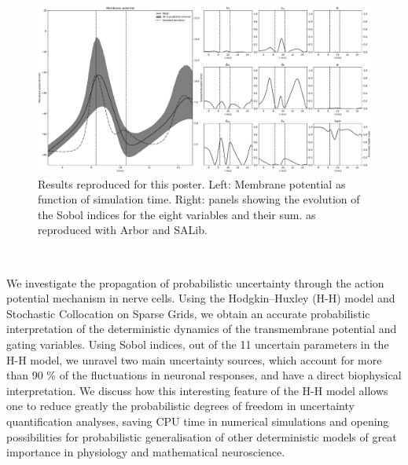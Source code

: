 \documentclass{beamer}
\begin{document}
\begin{frame}[t, fragile]
\begin{columns}[onlytextwidth,T]
\begin{column}{0.63\textwidth}
      \begin{figure}[htp]
        \centering
        \includegraphics[width=\textwidth]{hh_sensitivity}
          \caption{Results reproduced for this poster.
          Left: Membrane potential as function of simulation time. Right: panels showing
          the evolution of the Sobol indices for the eight variables and their sum.
          as reproduced with Arbor and SALib.}
          \label{result}
      \end{figure}

    \end{column}
  \end{columns}

  \vspace*{-24ex}

  \begin{columns}[onlytextwidth]
    \begin{column}{.49\linewidth}
      \vspace*{24ex}

      \textbf{}\\
      We investigate the propagation of probabilistic uncertainty through the action
      potential mechanism in nerve cells. Using the Hodgkin–Huxley (H-H) model
      and Stochastic Collocation on Sparse Grids, we obtain an accurate probabilistic
      interpretation of the deterministic dynamics of the transmembrane potential and gating
      variables. Using Sobol indices, out of the 11 uncertain parameters in the H-H model,
      we unravel two main uncertainty sources, which account for more than 90 \% of the
      fluctuations in neuronal responses, and have a direct biophysical interpretation. We
      discuss how this interesting feature of the H-H model allows one to reduce greatly the
      probabilistic degrees of freedom in uncertainty quantification analyses, saving CPU
      time in numerical simulations and opening possibilities for probabilistic generalisation
      of other deterministic models of great importance in physiology and mathematical neuroscience.


\end{column}
\end{columns}
\end{frame}
\end{document}
